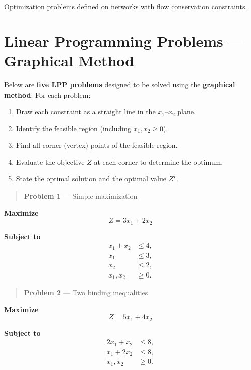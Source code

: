 \documentclass[
  letterpaper,
  DIV=11,
  numbers=noendperiod]{scrreprt}
\providecommand{\tightlist}{%
  \setlength{\itemsep}{0pt}\setlength{\parskip}{0pt}}
\begin{document}
Optimization problems defined on networks with flow conservation
constraints.

\section{Linear Programming Problems --- Graphical
Method}\label{linear-programming-problems-graphical-method}

Below are \textbf{five LPP problems} designed to be solved using the
\textbf{graphical method}. For each problem:

\begin{enumerate}
\def\labelenumi{\arabic{enumi}.}
\tightlist
\item
  Draw each constraint as a straight line in the \(x_1\)--\(x_2\)
  plane.\\
\item
  Identify the feasible region (including \(x_1,x_2\ge0\)).\\
\item
  Find all corner (vertex) points of the feasible region.\\
\item
  Evaluate the objective \(Z\) at each corner to determine the
  optimum.\\
\item
  State the optimal solution and the optimal value \(Z^\star\).
\end{enumerate}

\begin{quote}
\textbf{Problem 1} --- Simple maximization
\end{quote}

\textbf{Maximize} \[
Z = 3x_1 + 2x_2
\]

\textbf{Subject to} \[
\begin{aligned}
x_1 + x_2 &\le 4,\\
x_1 &\le 3,\\
x_2 &\le 2,\\
x_1, x_2 &\ge 0.
\end{aligned}
\]

\begin{quote}
\textbf{Problem 2} --- Two binding inequalities
\end{quote}

\textbf{Maximize} \[
Z = 5x_1 + 4x_2
\]

\textbf{Subject to} \[
\begin{aligned}
2x_1 + x_2 &\le 8,\\
x_1 + 2x_2 &\le 8,\\
x_1, x_2 &\ge 0.
\end{aligned}
\]
\end{document}
